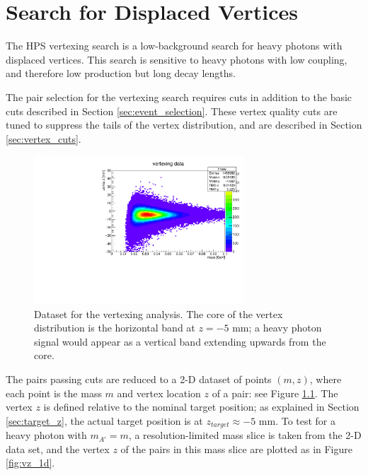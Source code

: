 \chapter{Search for Displaced Vertices}
\label{sec:vertexing}
The HPS vertexing search is a low-background search for heavy photons with displaced vertices.
This search is sensitive to heavy photons with low coupling, and therefore low production but long decay lengths.

The pair selection for the vertexing search requires cuts in addition to the basic cuts described in Section \ref{sec:event_selection}.
These vertex quality cuts are tuned to suppress the tails of the vertex distribution, and are described in Section \ref{sec:vertex_cuts}.

\begin{figure}[ht]
\begin{center}
    \includegraphics[width=0.7\textwidth,page=1,angle=-90]{vertexing/figs/golden_mres}
\end{center}
    \caption{Dataset for the vertexing analysis. The core of the vertex distribution is the horizontal band at $z=-5$ mm; a heavy photon signal would appear as a vertical band extending upwards from the core.}
    \label{fig:zvsmass}
\end{figure}

The pairs passing cuts are reduced to a 2-D dataset of points $(m,z)$, where each point is the mass $m$ and vertex location $z$ of a pair: see Figure \ref{fig:zvsmass}.
The vertex $z$ is defined relative to the nominal target position; as explained in Section \ref{sec:target_z}, the actual target position is at $z_{target}\approx -5$ mm.
To test for a heavy photon with $m_{A'}=m$, a resolution-limited mass slice is taken from the 2-D data set, and the vertex $z$ of the pairs in this mass slice are plotted as in Figure \ref{fig:vz_1d}.

